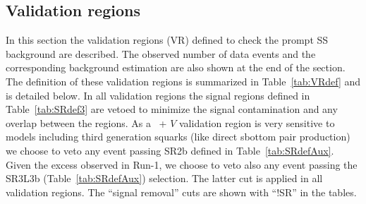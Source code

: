 %

   
\subsection {Validation regions}
\label{sec:bkg_VR}
In this section the validation regions (VR) defined to check the prompt SS background are described. The observed number of data events and the corresponding background estimation are also shown at the end of the section. The definition of these validation regions is 
summarized in Table~\ref{tab:VRdef} and is detailed below. 
In all validation regions the signal regions defined in Table~\ref{tab:SRdef3} are vetoed to minimize the signal contamination and any overlap between the regions. As a \ttbar\ + $V$ validation region is very sensitive to models including third generation squarks (like direct sbottom pair production) we choose to veto any event passing SR2b defined in Table~\ref{tab:SRdefAux}. Given the excess observed in Run-1, we choose to veto also any event passing the SR3L3b (Table~\ref{tab:SRdefAux}) selection. The latter cut is applied in all validation regions. The ``signal removal'' cuts are shown with ``!SR'' in the tables.


